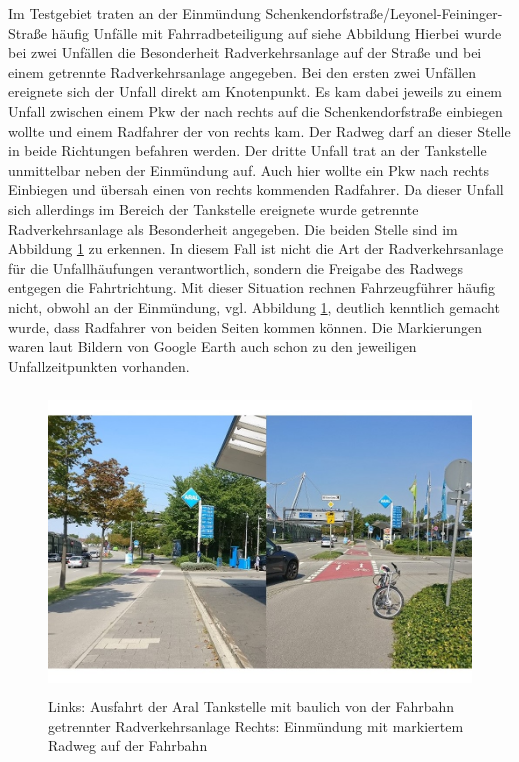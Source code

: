 Im Testgebiet traten an der Einmündung Schenkendorfstraße/Leyonel-Feininger-Straße häufig Unfälle mit Fahrradbeteiligung auf siehe Abbildung %
Hierbei wurde bei zwei Unfällen die Besonderheit Radverkehrsanlage auf der Straße und bei einem getrennte Radverkehrsanlage angegeben. Bei den ersten zwei Unfällen ereignete sich der Unfall direkt am Knotenpunkt. Es kam dabei jeweils zu einem Unfall zwischen einem Pkw der nach rechts auf die Schenkendorfstraße einbiegen wollte und einem Radfahrer der von rechts kam. Der Radweg darf an dieser Stelle in beide Richtungen befahren werden. Der dritte Unfall trat an der Tankstelle unmittelbar neben der Einmündung auf. Auch hier wollte ein Pkw nach rechts Einbiegen und übersah einen von rechts kommenden Radfahrer. Da dieser Unfall sich allerdings im Bereich der Tankstelle ereignete wurde getrennte Radverkehrsanlage als Besonderheit angegeben. Die beiden Stelle sind im Abbildung \ref{fig:Lyonel-Feininger} zu erkennen. In diesem Fall ist nicht die Art der Radverkehrsanlage für die Unfallhäufungen verantwortlich, sondern die Freigabe des Radwegs entgegen die Fahrtrichtung. Mit dieser Situation rechnen Fahrzeugführer häufig nicht, obwohl an der Einmündung, vgl. Abbildung \ref{fig:Lyonel-Feininger}, deutlich kenntlich gemacht wurde, dass Radfahrer von beiden Seiten kommen können. Die Markierungen waren laut Bildern von Google Earth auch schon zu den jeweiligen Unfallzeitpunkten vorhanden.

\begin{savenotes}
	\begin{figure}[H]
		\centering
		\includegraphics[width=12cm,height=8cm]{figures/Lyonel_Feininger}
		\caption[Ausfahrt Aral Tankstelle und Einmündung Lyonel-Feininger-Straße]{Links: Ausfahrt der Aral Tankstelle mit baulich von der Fahrbahn getrennter Radverkehrsanlage Rechts: Einmündung mit markiertem Radweg auf der Fahrbahn}\label{fig:Lyonel-Feininger}
	\end{figure}
\end{savenotes}

